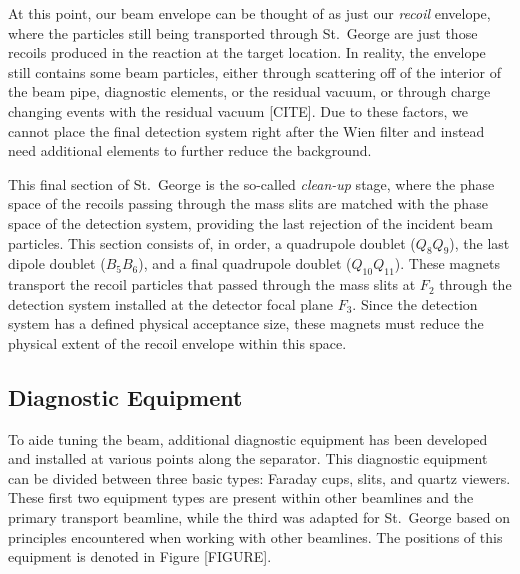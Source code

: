 At this point, our beam envelope can be thought of as just our \textit{recoil}
envelope, where the particles still being transported through St.\ George are
just those recoils produced in the reaction at the target location. In reality,
the envelope still contains some beam particles, either through scattering off
of the interior of the beam pipe, diagnostic elements, or the residual vacuum,
or through charge changing events with the residual vacuum [CITE]. Due to these
factors, we cannot place the final detection system right after the Wien
filter and instead need additional elements to further reduce the background.

This final section of St.\ George is the so-called \textit{clean-up} stage,
where the phase space of the recoils passing through the mass slits are matched
with the phase space of the detection system, providing the last rejection of
the incident beam particles. This section consists of, in order, a quadrupole
doublet ($Q_8Q_9$), the last dipole doublet ($B_5B_6$), and a final quadrupole
doublet ($Q_{10}Q_{11}$). These magnets transport the recoil particles that
passed through the mass slits at $F_2$ through the detection system installed
at the detector focal plane $F_3$. Since the detection system has a defined
physical acceptance size, these magnets must reduce the physical extent of the
recoil envelope within this space.


\subsection{Diagnostic Equipment}
\label{sec:diagnostic}

To aide tuning the beam, additional diagnostic equipment has been developed and
installed at various points along the separator. This diagnostic equipment can
be divided between three basic types: Faraday cups, slits, and quartz viewers.
These first two equipment types are present within other beamlines and the
primary transport beamline, while the third was adapted for St.\ George based
on principles encountered when working with other beamlines. The positions of
this equipment is denoted in Figure [FIGURE].

